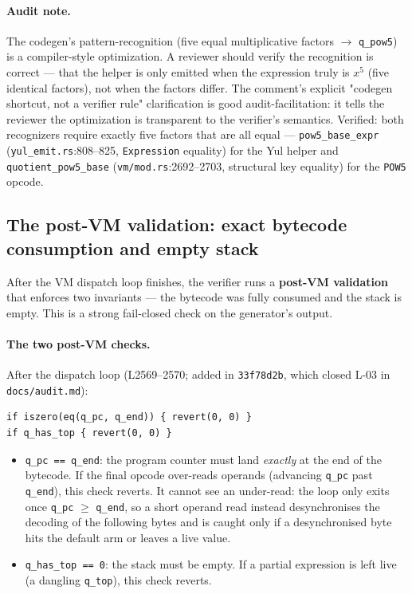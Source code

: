 \paragraph{Audit note.} The codegen's pattern-recognition (five
equal multiplicative factors $\to$ \texttt{q\_pow5}) is a
compiler-style optimization. A reviewer should verify the
recognition is correct --- that the helper is only emitted when
the expression truly is $x^5$ (five identical factors), not when
the factors differ. The comment's explicit "codegen shortcut, not
a verifier rule" clarification is good audit-facilitation: it
tells the reviewer the optimization is transparent to the
verifier's semantics.  Verified: both
recognizers require exactly five factors that are all equal ---
\texttt{pow5\_base\_expr} (\texttt{yul\_emit.rs}:808--825,
\texttt{Expression} equality) for the Yul helper and
\texttt{quotient\_\allowbreak{}pow5\_\allowbreak{}base} (\texttt{vm/mod.rs}:2692--2703,
structural key equality) for the \texttt{POW5} opcode.

\subsection{The post-VM validation: exact bytecode consumption and empty stack}
\label{sec:pr-postvm}

After the VM dispatch loop finishes, the verifier runs a
\textbf{post-VM validation} that enforces two invariants --- the
bytecode was fully consumed and the stack is empty. This is a
strong fail-closed check on the generator's output.

\paragraph{The two post-VM checks.} After the dispatch loop
(L2569--2570; added in \texttt{33f78d2b}, which closed L-03 in
\texttt{docs/audit.md}):
\begin{lstlisting}[style=yul]
if iszero(eq(q_pc, q_end)) { revert(0, 0) }
if q_has_top { revert(0, 0) }
\end{lstlisting}
\begin{itemize}
\item \texttt{q\_pc == q\_end}: the program counter must land
  \emph{exactly} at the end of the bytecode. If the final opcode
  over-reads operands (advancing \texttt{q\_pc} past
  \texttt{q\_end}), this check reverts. It cannot see an
  under-read: the loop only exits once \texttt{q\_pc} $\ge$
  \texttt{q\_end}, so a short operand read instead desynchronises
  the decoding of the following bytes and is caught only if a
  desynchronised byte hits the default arm or leaves a live
  value.
\item \texttt{q\_has\_top == 0}: the stack must be empty. If a
  partial expression is left live (a dangling \texttt{q\_top}),
  this check reverts.
\end{itemize}


